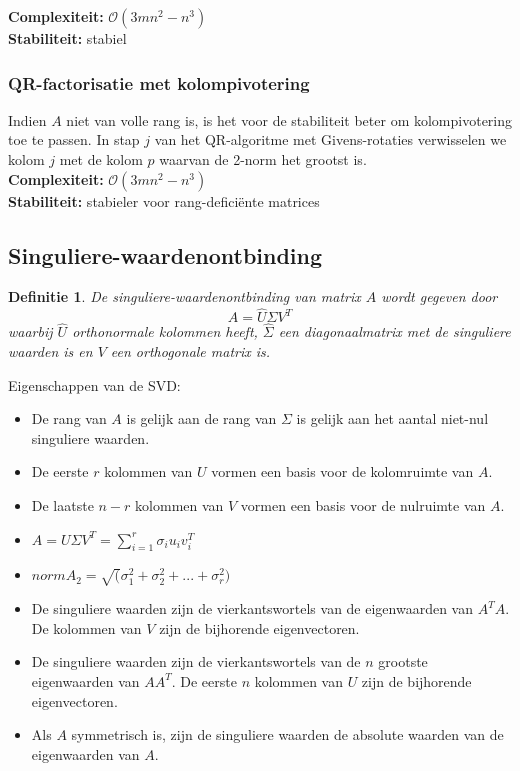 \documentclass{article}
\newtheorem{mydef}{Definitie}
\begin{document}
	\textbf{Complexiteit:} $\mathcal{O}(3mn^2 - n^3)$ \\
	\textbf{Stabiliteit:} stabiel


	
	\subsubsection{QR-factorisatie met kolompivotering}
	Indien $A$ niet van volle rang is, is het voor de stabiliteit beter om kolompivotering toe te passen. In stap $j$ van het QR-algoritme met Givens-rotaties verwisselen we kolom $j$ met de kolom $p$ waarvan de 2-norm het grootst is.\\
		
	\textbf{Complexiteit:} $\mathcal{O}(3mn^2 - n^3)$ \\
	\textbf{Stabiliteit:} stabieler voor rang-deficiënte matrices
	
	\subsection{Singuliere-waardenontbinding}
	
	\begin{mydef}
		De singuliere-waardenontbinding van matrix $A$ wordt gegeven door
		$$
		A = \hat{U}\hat{\Sigma}V^T
		$$
		waarbij $\hat{U}$ orthonormale kolommen heeft, $\hat{\Sigma}$ een diagonaalmatrix met de singuliere waarden is en $V$ een orthogonale matrix is.
	\end{mydef}

	Eigenschappen van de SVD:
	\begin{itemize}
		\item De rang van $A$ is gelijk aan de rang van $\Sigma$ is gelijk aan het aantal niet-nul singuliere waarden.
		\item De eerste $r$ kolommen van $U$ vormen een basis voor de kolomruimte van $A$.
		\item De laatste $n-r$ kolommen van $V$ vormen een basis voor de nulruimte van $A$.
		\item $ A = U \Sigma V^T = \sum_{i=1}^{r} \sigma_i u_i v_i^T $
		\item $ norm{A}_2 = \sqrt(\sigma_1^2 + \sigma_2^2 + ... + \sigma_r^2) $
		\item De singuliere waarden zijn de vierkantswortels van de eigenwaarden van $A^TA$. De kolommen van $V$ zijn de bijhorende eigenvectoren.
		\item De singuliere waarden zijn de vierkantswortels van de $n$ grootste eigenwaarden van $AA^T$. De eerste $n$ kolommen van $U$ zijn de bijhorende eigenvectoren.
		\item Als $A$ symmetrisch is, zijn de singuliere waarden de absolute waarden van de eigenwaarden van $A$.
	\end{itemize}
\end{document}
